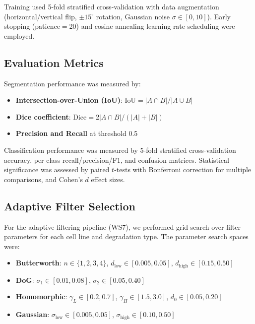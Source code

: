 \documentclass[11pt,a4paper]{article}
\begin{document}
Training used 5-fold stratified cross-validation with data augmentation
(horizontal/vertical flip, $\pm 15^\circ$ rotation, Gaussian noise
$\sigma \in [0, 10]$). Early stopping (patience$=$20) and cosine
annealing learning rate scheduling were employed.

\subsection{Evaluation Metrics}
\label{sec:metrics}

Segmentation performance was measured by:
\begin{itemize}[nosep]
    \item \textbf{Intersection-over-Union (IoU)}:
          $\text{IoU} = |A \cap B| / |A \cup B|$
    \item \textbf{Dice coefficient}:
          $\text{Dice} = 2|A \cap B| / (|A| + |B|)$
    \item \textbf{Precision and Recall} at threshold 0.5
\end{itemize}

Classification performance was measured by 5-fold stratified
cross-validation accuracy, per-class recall/precision/F1, and confusion
matrices. Statistical significance was assessed by paired $t$-tests with
Bonferroni correction for multiple comparisons, and Cohen's $d$ effect
sizes.

\subsection{Adaptive Filter Selection}
\label{sec:adaptive}

For the adaptive filtering pipeline (WS7), we performed grid search over
filter parameters for each cell line and degradation type. The parameter
search spaces were:

\begin{itemize}[nosep]
    \item \textbf{Butterworth}: $n \in \{1,2,3,4\}$,
          $d_{\text{low}} \in [0.005, 0.05]$, $d_{\text{high}} \in [0.15, 0.50]$
    \item \textbf{DoG}: $\sigma_1 \in [0.01, 0.08]$, $\sigma_2 \in [0.05, 0.40]$
    \item \textbf{Homomorphic}: $\gamma_L \in [0.2, 0.7]$,
          $\gamma_H \in [1.5, 3.0]$, $d_0 \in [0.05, 0.20]$
    \item \textbf{Gaussian}: $\sigma_{\text{low}} \in [0.005, 0.05]$,
          $\sigma_{\text{high}} \in [0.10, 0.50]$
\end{itemize}
\end{document}
